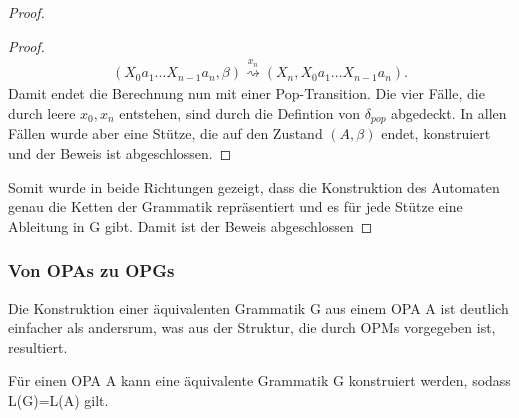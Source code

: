 \begin{proof}
\begin{proof}
\begin{eqnarray*}
(X_0a_1...X_{n-1}a_n, \beta) \stackrel{x_n}{\rightsquigarrow} (X_n, X_0a_1...X_{n-1}a_n).
\end{eqnarray*}
Damit endet die Berechnung nun mit einer Pop-Transition. Die vier Fälle, die durch leere $x_0, x_n$ entstehen, sind durch die Defintion von $\delta_{pop}$ abgedeckt. In allen Fällen wurde aber eine Stütze, die auf den Zustand $(A, \beta)$ endet, konstruiert und der Beweis ist abgeschlossen.
\end{proof}
Somit wurde in beide Richtungen gezeigt, dass die Konstruktion des Automaten genau die Ketten der Grammatik repräsentiert und es für jede Stütze eine Ableitung in G gibt. Damit ist der Beweis abgeschlossen 
\end{proof}


\subsubsection{Von OPAs zu OPGs}
Die Konstruktion einer äquivalenten Grammatik G aus einem OPA A ist deutlich einfacher als andersrum, was aus der Struktur, die durch OPMs vorgegeben ist, resultiert.
\begin{lemma}
Für einen OPA A kann eine äquivalente Grammatik G konstruiert werden, sodass L(G)=L(A) gilt.
\end{lemma}
